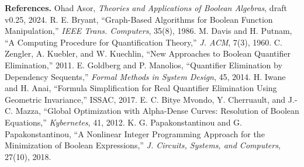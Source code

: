 \documentclass[10pt]{article}
\begin{document}
\footnotesize
\textbf{References.}
Ohad Asor, \emph{Theories and Applications of Boolean Algebras}, draft v0.25,
2024.
R. E. Bryant, ``Graph-Based Algorithms for Boolean Function Manipulation,''
\emph{IEEE Trans. Computers}, 35(8), 1986.
M. Davis and H. Putnam, ``A Computing Procedure for Quantification Theory,''
\emph{J. ACM}, 7(3), 1960.
C. Zengler, A. Kuebler, and W. Kuechlin, ``New Approaches to Boolean Quantifier
Elimination,'' 2011.
E. Goldberg and P. Manolios, ``Quantifier Elimination by Dependency Sequents,''
\emph{Formal Methods in System Design}, 45, 2014.
H. Iwane and H. Anai, ``Formula Simplification for Real Quantifier Elimination
Using Geometric Invariance,'' ISSAC, 2017.
E. C. Bitye Mvondo, Y. Cherruault, and J.-C. Mazza, ``Global Optimization with
Alpha-Dense Curves: Resolution of Boolean Equations,'' \emph{Kybernetes}, 41,
2012.
K. G. Papakonstantinou and G. Papakonstantinou, ``A Nonlinear Integer
Programming Approach for the Minimization of Boolean Expressions,''
\emph{J. Circuits, Systems, and Computers}, 27(10), 2018.
\end{document}
